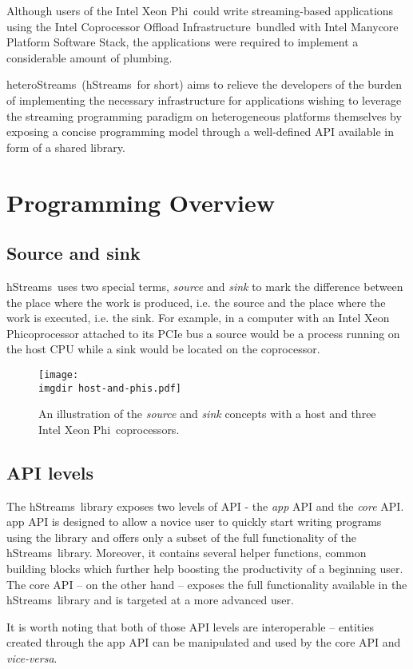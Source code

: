 \documentclass[a4,oneside]{book}
\newcommand{\ixp}{Intel\textregistered{} Xeon Phi\texttrademark{}}
\newcommand{\coi}{Intel\textregistered{} Coprocessor Offload Infrastructure}
\newcommand{\mpssFullName}{Intel\textregistered{} Manycore Platform Software Stack}
\newcommand{\hstreams}{hStreams}
\newcommand{\heterostreams}{heteroStreams}
\newcommand{\imgdir}{../../../doc/images/}
\begin{document}
Although users of the \ixp\ could write streaming-based applications using the \coi\ bundled with \mpssFullName, the applications were required to implement a considerable amount of plumbing.

\heterostreams\ (\hstreams\ for short) aims to relieve the developers of the burden of implementing the necessary infrastructure for applications wishing to leverage the streaming programming paradigm on heterogeneous platforms themselves by exposing a concise programming model through a well-defined API available in form of a shared library.

\chapter{Programming Overview}
\section{Source and sink}
\hstreams\ uses two special terms, \emph{source} and \emph{sink} to mark the difference between the place where the work is produced, i.e. the source and the place where the work is executed, i.e. the sink.
For example, in a computer with an \ixp coprocessor attached to its PCIe bus a source would be a process running on the host CPU while a sink would be located on the coprocessor. 
\begin{figure}[h]
    \centering
    \texttt{[image: \\imgdir host-and-phis.pdf]}
    \caption{An illustration of the \emph{source} and \emph{sink} concepts with a host and three \ixp\ coprocessors.}
    \label{fig:host-and-phis}
\end{figure}

\section{API levels}
The \hstreams\ library exposes two levels of API - the \emph{app} API and the \emph{core} API.
app API is designed to allow a novice user to quickly start writing programs using the library and offers only a subset of the full functionality of the \hstreams\ library.
Moreover, it contains several helper functions, common building blocks which further help boosting the productivity of a beginning user.
The core API -- on the other hand -- exposes the full functionality available in the \hstreams\ library and is targeted at a more advanced user.

It is worth noting that both of those API levels are interoperable -- entities created through the app API can be manipulated and used by the core API and \emph{vice-versa}.
\end{document}
